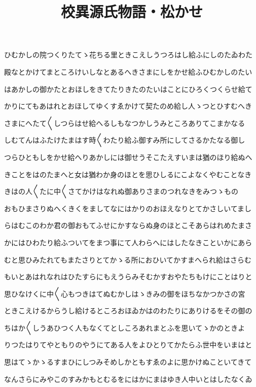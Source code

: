 \documentclass[a4paper,11pt,landscape]{ltjtarticle}
\title{校異源氏物語・松かせ}
\date{}
\begin{document}
\maketitle

ひむかしの院つくりたてゝ花ちる里ときこえしうつろはし給ふにしのたゐわた
\par\medskip
殿なとかけてまところけいしなとあるへきさまにしをかせ給ふひむかしのたい
\par\medskip
はあかしの御かたとおほしをきてたりきたのたいはことにひろくつくらせ給て
\par\medskip
かりにてもあはれとおほしてゆくすゑかけて契たのめ給し人ゝつとひすむへき
\par\medskip
さまにへたて〱しつらはせ給へるしもなつかしうみところありてこまかなる
\par\medskip
しむてんはふたけたまはす時〱わたり給ふ御すみ所にしてさるかたなる御し
\par\medskip
つらひともしをかせ給へりあかしには御せうそこたえすいまは猶のほり給ぬへ
\par\medskip
きことをはのたまへと女は猶わか身のほとを思ひしるにこよなくやむことなき
\par\medskip
きはの人〱たに中〱さてかけはなれぬ御ありさまのつれなきをみつゝもの
\par\medskip
おもひまさりぬへくきくをましてなにはかりのおほえなりとてかさしいてまし
\par\medskip
らはむこのわか君の御おもてふせにかすならぬ身のほとこそあらはれめたまさ
\par\medskip
かにはひわたり給ふついてをまつ事にて人わらへにはしたなきこといかにあら
\par\medskip
むと思ひみたれてもまたさりとてかゝる所におひいてかすまへられ給はさらむ
\par\medskip
もいとあはれなれはひたすらにもえうらみそむかすおやたちもけにことはりと
\par\medskip
思ひなけくに中〱心もつきはてぬむかしはゝきみの御をほちなかつかさの宮
\par\medskip
ときこえけるからうし給けるところおほゐかはのわたりにありけるをその御の
\par\medskip
ちはか〱しうあひつく人もなくてとしころあれまとふを思いてゝかのときよ
\par\medskip
りつたはりてやともりのやうにてある人をよひとりてかたらふ世中をいまはと
\par\medskip
思はてゝかゝるすまひにしつみそめしかともすゑのよに思かけぬこといてきて
\par\medskip
なんさらにみやこのすみかもとむるをにはかにまはゆき人中いとはしたなくゐ
\end{document}

